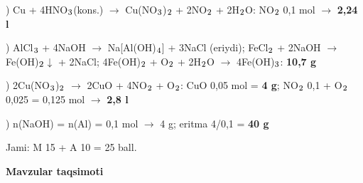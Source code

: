 \documentclass[11pt,a4paper]{article}
\renewcommand{\textsubscript}[1]{\ensuremath{_{\text{\fontsize{8}{8}\selectfont #1}}}}
\begin{document}
) Cu + 4HNO\textsubscript{3}(kons.) $\to$ Cu(NO\textsubscript{3})\textsubscript{2} + 2NO\textsubscript{2} + 2H\textsubscript{2}O: NO\textsubscript{2} 0,1 mol $\to$ \textbf{2,24 l}\par
{}) AlCl\textsubscript{3} + 4NaOH $\to$ Na[Al(OH)\textsubscript{4}] + 3NaCl (eriydi); FeCl\textsubscript{2} + 2NaOH $\to$ Fe(OH)\textsubscript{2}$\downarrow$ + 2NaCl; 4Fe(OH)\textsubscript{2} + O\textsubscript{2} + 2H\textsubscript{2}O $\to$ 4Fe(OH)\textsubscript{3}: \textbf{10,7 g}\par
{}) 2Cu(NO\textsubscript{3})\textsubscript{2} $\to$ 2CuO + 4NO\textsubscript{2} + O\textsubscript{2}: CuO 0,05 mol = \textbf{4 g}; NO\textsubscript{2} 0,1 + O\textsubscript{2} 0,025 = 0,125 mol $\to$ \textbf{2,8 l}\par
{}) n(NaOH) = n(Al) = 0,1 mol $\to$ 4 g; eritma 4/0,1 = \textbf{40 g}\par
\noindent Jami: M 15 + A 10 = 25 ball.\par
\par\bigskip\noindent\textbf{Mavzular taqsimoti}\par\smallskip
\end{document}
